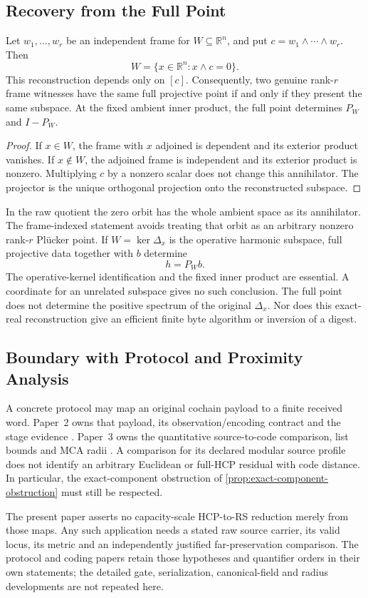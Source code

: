 \subsection{Recovery from the Full Point}

\begin{proposition}
\label{prop:plucker-recovery}
  Let \(w_1,\ldots,w_r\) be an independent frame for
  \(W\subseteq\mathbb R^n\), and put
  \(c=w_1\wedge\cdots\wedge w_r\). Then
  \[
    W=\{x\in\mathbb R^n:x\wedge c=0\}.
  \]
  This reconstruction depends only on \([c]\). Consequently, two genuine
  rank-\(r\) frame witnesses have the same full projective point if and only
  if they present the same subspace. At the fixed ambient inner product,
  the full point determines \(P_W\) and \(I-P_W\).
\end{proposition}
\begin{proof}
  If \(x\in W\), the frame with \(x\) adjoined is dependent and its exterior
  product vanishes. If \(x\notin W\), the adjoined frame is independent and
  its exterior product is nonzero. Multiplying \(c\) by a nonzero scalar
  does not change this annihilator. The projector is the unique orthogonal
  projection onto the reconstructed subspace.
\end{proof}

In the raw quotient the zero orbit has the whole ambient space as its
annihilator. The frame-indexed statement avoids treating that orbit as an
arbitrary nonzero rank-\(r\) Pl\"ucker point.
If \(W=\ker\Delta_x\) is the operative harmonic subspace, full projective
data together with \(b\) determine
\[
  h=P_Wb.
\]
The operative-kernel identification and the fixed inner product are essential.
A coordinate for an unrelated subspace gives no such conclusion. The full
point does not determine the positive spectrum of the original \(\Delta_x\).
Nor does this exact-real reconstruction give an efficient finite byte
algorithm or inversion of a digest.

\subsection{Boundary with Protocol and Proximity Analysis}

A concrete protocol may map an original cochain payload to a finite received
word. Paper~2 owns that payload, its observation/encoding contract and the
stage evidence \cite{vanDerVlugt2026protocol}. Paper~3 owns the quantitative
source-to-code comparison, list bounds and MCA radii
\cite{vanDerVlugt2026proximity}. A comparison for its declared modular source
profile does not identify an arbitrary Euclidean or full-HCP residual with
code distance. In particular, the exact-component obstruction of
\cref{prop:exact-component-obstruction} must still be respected.

The present paper asserts no capacity-scale HCP-to-RS reduction merely from
those maps. Any such application needs a stated raw source carrier, its
valid locus, its metric and an independently justified far-preservation
comparison. The protocol and coding papers retain those hypotheses and
quantifier orders in their own statements; the detailed gate, serialization,
canonical-field and radius developments are not repeated here.
